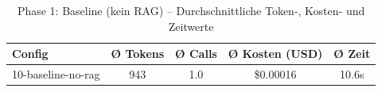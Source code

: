 \begin{table}[H]
\centering
\small
\begin{tabular}{lcccc}
\toprule
Config & Ø Tokens & Ø Calls & Ø Kosten (USD) & Ø Zeit \\
\midrule
10-baseline-no-rag & 943 & 1.0 & \$0.00016 & 10.6s \\
\bottomrule
\end{tabular}
\caption{Phase 1: Baseline (kein RAG) -- Durchschnittliche Token-, Kosten- und Zeitwerte}
\label{tab:phase1_cost}
\end{table}